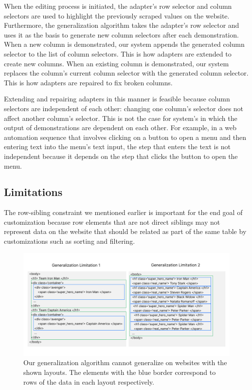 \documentclass[sigconf,10pt]{acmart}
\begin{document}
When the editing process is initiated, the adapter's row selector and
column selectors are used to highlight the previously scraped values on
the website. Furthermore, the generalization algorithm takes the
adapter's row selector and uses it as the basis to generate new column
selectors after each demonstration. When a new column is demonstrated,
our system appends the generated column selector to the list of column
selectors. This is how adapters are extended to create new columns. When
an existing column is demonstrated, our system replaces the column's
current column selector with the generated column selector. This is how
adapters are repaired to fix broken columns.

Extending and repairing adapters in this manner is feasible because
column selectors are independent of each other: changing one column's
selector does not affect another column's selector. This is not the case
for system's in which the output of demonstrations are dependent on each
other. For example, in a web automation sequence that involves clicking
on a button to open a menu and then entering text into the menu's text
input, the step that enters the text is not independent because it
depends on the step that clicks the button to open the menu.

\hypertarget{limitations}{%
\subsection{Limitations}\label{limitations}}

The row-sibling constraint we mentioned earlier is important for the end
goal of customization because row elements that are not direct siblings
may not represent data on the website that should be related as part of
the same table by customizations such as sorting and filtering.

\begin{figure}
  \includegraphics[width=\textwidth]{media/limitations.png}
  \caption{\label{fig:limitations} Our generalization algorithm cannot generalize on websites with the shown layouts. The elements with the blue border correspond to rows of the data in each layout respectively.}
\end{figure}
\end{document}

